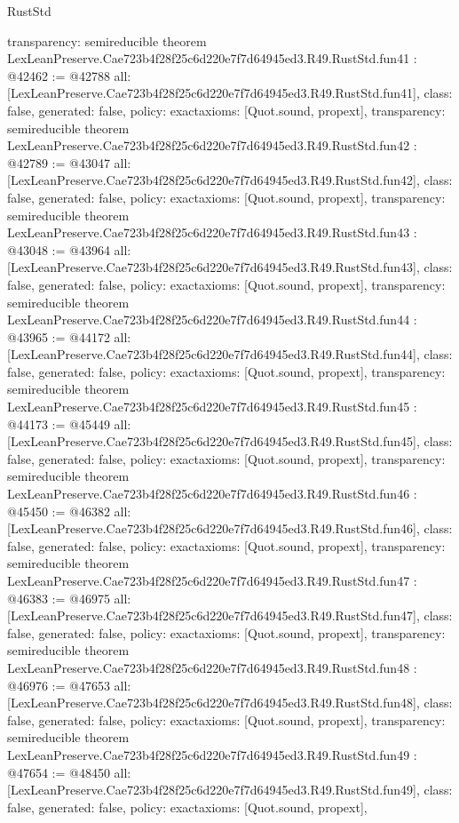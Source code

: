 \begin{lexlean}{RustStd}
\begin{coremodule}
{  transparency: semireducible
}
theorem LexLeanPreserve.Cae723b4f28f25c6d220e7f7d64945ed3.R49.RustStd.fun41 : @42462 := @42788 {
  all: [LexLeanPreserve.Cae723b4f28f25c6d220e7f7d64945ed3.R49.RustStd.fun41],
  class: false,
  generated: false,
  policy: exact{axioms: [Quot.sound, propext]},
  transparency: semireducible
}
theorem LexLeanPreserve.Cae723b4f28f25c6d220e7f7d64945ed3.R49.RustStd.fun42 : @42789 := @43047 {
  all: [LexLeanPreserve.Cae723b4f28f25c6d220e7f7d64945ed3.R49.RustStd.fun42],
  class: false,
  generated: false,
  policy: exact{axioms: [Quot.sound, propext]},
  transparency: semireducible
}
theorem LexLeanPreserve.Cae723b4f28f25c6d220e7f7d64945ed3.R49.RustStd.fun43 : @43048 := @43964 {
  all: [LexLeanPreserve.Cae723b4f28f25c6d220e7f7d64945ed3.R49.RustStd.fun43],
  class: false,
  generated: false,
  policy: exact{axioms: [Quot.sound, propext]},
  transparency: semireducible
}
theorem LexLeanPreserve.Cae723b4f28f25c6d220e7f7d64945ed3.R49.RustStd.fun44 : @43965 := @44172 {
  all: [LexLeanPreserve.Cae723b4f28f25c6d220e7f7d64945ed3.R49.RustStd.fun44],
  class: false,
  generated: false,
  policy: exact{axioms: [Quot.sound, propext]},
  transparency: semireducible
}
theorem LexLeanPreserve.Cae723b4f28f25c6d220e7f7d64945ed3.R49.RustStd.fun45 : @44173 := @45449 {
  all: [LexLeanPreserve.Cae723b4f28f25c6d220e7f7d64945ed3.R49.RustStd.fun45],
  class: false,
  generated: false,
  policy: exact{axioms: [Quot.sound, propext]},
  transparency: semireducible
}
theorem LexLeanPreserve.Cae723b4f28f25c6d220e7f7d64945ed3.R49.RustStd.fun46 : @45450 := @46382 {
  all: [LexLeanPreserve.Cae723b4f28f25c6d220e7f7d64945ed3.R49.RustStd.fun46],
  class: false,
  generated: false,
  policy: exact{axioms: [Quot.sound, propext]},
  transparency: semireducible
}
theorem LexLeanPreserve.Cae723b4f28f25c6d220e7f7d64945ed3.R49.RustStd.fun47 : @46383 := @46975 {
  all: [LexLeanPreserve.Cae723b4f28f25c6d220e7f7d64945ed3.R49.RustStd.fun47],
  class: false,
  generated: false,
  policy: exact{axioms: [Quot.sound, propext]},
  transparency: semireducible
}
theorem LexLeanPreserve.Cae723b4f28f25c6d220e7f7d64945ed3.R49.RustStd.fun48 : @46976 := @47653 {
  all: [LexLeanPreserve.Cae723b4f28f25c6d220e7f7d64945ed3.R49.RustStd.fun48],
  class: false,
  generated: false,
  policy: exact{axioms: [Quot.sound, propext]},
  transparency: semireducible
}
theorem LexLeanPreserve.Cae723b4f28f25c6d220e7f7d64945ed3.R49.RustStd.fun49 : @47654 := @48450 {
  all: [LexLeanPreserve.Cae723b4f28f25c6d220e7f7d64945ed3.R49.RustStd.fun49],
  class: false,
  generated: false,
  policy: exact{axioms: [Quot.sound, propext]},
}
\end{coremodule}
\end{lexlean}

